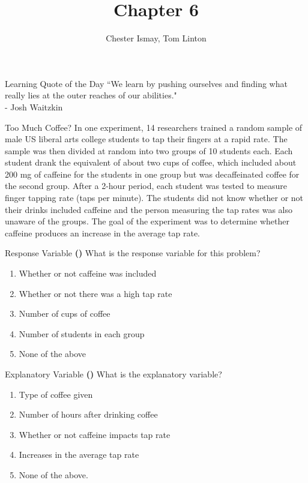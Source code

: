 \documentclass[13pt]{beamer}
\title{Chapter 6}
\author{Chester Ismay, Tom Linton}
\institute{Ripon College, Central College}
\date{}
\newcounter{count}
\newcommand{\quotes}[2]{\centering \Large{``#1"\\
\vspace*{0.2in}
\hspace*{0.5in} - #2}}
\newcommand{\question}{ \textbf{(\decimal{count})} \stepcounter{count}}
\newenvironment{click}{\begin{enumerate}[A]}{\end{enumerate}}
\begin{document}
\begin{frame}
  \titlepage
\end{frame}


\begin{frame}{Learning Quote of the Day}
\quotes{We learn by pushing ourselves and finding what really lies at the outer reaches of our abilities.}{Josh Waitzkin}
\end{frame}


\begin{frame}{Too Much Coffee?}
In one experiment, 14 researchers trained a random sample of male US liberal arts
college students to tap their fingers at a rapid rate. The sample was then divided
at random into two groups of 10 students each. Each student drank the
equivalent of about two cups of coffee, which included about 200 mg of caffeine
for the students in one group but was decaffeinated coffee for the second group.
After a 2-hour period, each student was tested to measure finger tapping rate
(taps per minute). The students did not know whether or not their drinks
included caffeine and the person measuring the tap rates was also unaware of
the groups. The goal of the experiment was to determine whether caffeine produces an increase in the average tap rate.
\end{frame}

\begin{frame}{Response Variable}
\question What is the response variable for this problem?
\begin{click}
   \item Whether or not caffeine was included
   \item Whether or not there was a high tap rate
   \item Number of cups of coffee
   \item Number of students in each group
   \item None of the above %
\end{click}
\end{frame}

\begin{frame}{Explanatory Variable}
\question What is the explanatory variable?
\begin{click}
   \item Type of coffee given %
   \item Number of hours after drinking coffee
   \item Whether or not caffeine impacts tap rate
   \item Increases in the average tap rate
   \item None of the above.
\end{click}
\end{frame}
\end{document}
